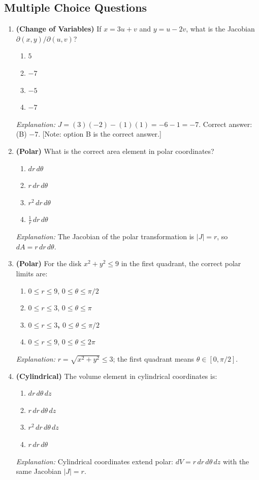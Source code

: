 \documentclass[12pt,a4paper]{article}
\begin{document}
\subsection*{Multiple Choice Questions}

\begin{enumerate}[label=\textbf{MCQ\arabic*.}, leftmargin=2.5em]

\item \textbf{(Change of Variables)} If $x = 3u + v$ and $y = u - 2v$, what is the Jacobian
  $\partial(x,y)/\partial(u,v)$?
  \begin{enumerate}[label=(\Alph*)]
    \item $5$
    \item $-7$
    \item $-5$
    \item \textbf{$-7$}
  \end{enumerate}
  \textit{Explanation:} $J = (3)(-2) - (1)(1) = -6 - 1 = -7$. Correct answer: (B) $-7$.
  [Note: option B is the correct answer.]

\item \textbf{(Polar)} What is the correct area element in polar coordinates?
  \begin{enumerate}[label=(\Alph*)]
    \item $dr\,d\theta$
    \item \textbf{$r\,dr\,d\theta$}
    \item $r^2\,dr\,d\theta$
    \item $\tfrac{1}{r}\,dr\,d\theta$
  \end{enumerate}
  \textit{Explanation:} The Jacobian of the polar transformation is $|J|=r$, so $dA = r\,dr\,d\theta$.

\item \textbf{(Polar)} For the disk $x^2+y^2 \leq 9$ in the first quadrant, the correct polar limits are:
  \begin{enumerate}[label=(\Alph*)]
    \item $0 \leq r \leq 9$, $0 \leq \theta \leq \pi/2$
    \item $0 \leq r \leq 3$, $0 \leq \theta \leq \pi$
    \item \textbf{$0 \leq r \leq 3$, $0 \leq \theta \leq \pi/2$}
    \item $0 \leq r \leq 9$, $0 \leq \theta \leq 2\pi$
  \end{enumerate}
  \textit{Explanation:} $r = \sqrt{x^2+y^2} \leq 3$; the first quadrant means $\theta \in [0,\pi/2]$.

\item \textbf{(Cylindrical)} The volume element in cylindrical coordinates is:
  \begin{enumerate}[label=(\Alph*)]
    \item $dr\,d\theta\,dz$
    \item \textbf{$r\,dr\,d\theta\,dz$}
    \item $r^2\,dr\,d\theta\,dz$
    \item $r\,dr\,d\theta$
  \end{enumerate}
  \textit{Explanation:} Cylindrical coordinates extend polar: $dV = r\,dr\,d\theta\,dz$ with the same Jacobian $|J|=r$.


\end{enumerate}
\end{document}
